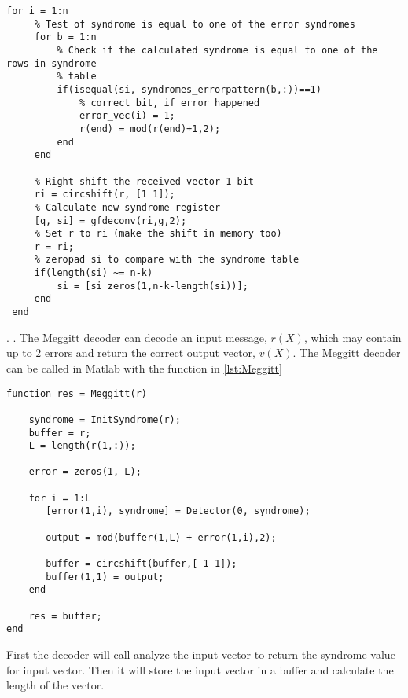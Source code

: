 \documentclass[Main]{subfiles}
\begin{document}
\begin{lstlisting}[caption=Error detection, style=Code-Matlab, label=lst:ErrorDetection]
 for i = 1:n
     % Test of syndrome is equal to one of the error syndromes
     for b = 1:n
         % Check if the calculated syndrome is equal to one of the rows in syndrome
         % table
         if(isequal(si, syndromes_errorpattern(b,:))==1)
             % correct bit, if error happened
             error_vec(i) = 1;
             r(end) = mod(r(end)+1,2);
         end
     end
     
     % Right shift the received vector 1 bit
     ri = circshift(r, [1 1]);
     % Calculate new syndrome register
     [q, si] = gfdeconv(ri,g,2);
     % Set r to ri (make the shift in memory too)
     r = ri;
     % zeropad si to compare with the syndrome table
     if(length(si) ~= n-k)
         si = [si zeros(1,n-k-length(si))];
     end
 end
\end{lstlisting}


.\newline
.\newline
The Meggitt decoder can decode an input message, $r(X)$, which may contain up to 2 errors and return the correct output vector, $v(X)$.
The Meggitt decoder can be called in Matlab with the function in \codeTitle \ref{lst:Meggitt}

\begin{lstlisting}[caption=Meggit decoder function, style=Code-Matlab, label=lst:Meggitt]
function res = Meggitt(r)

	syndrome = InitSyndrome(r);
	buffer = r;
	L = length(r(1,:));
	
	error = zeros(1, L);
	
	for i = 1:L
	   [error(1,i), syndrome] = Detector(0, syndrome); 
	
	   output = mod(buffer(1,L) + error(1,i),2);
	
	   buffer = circshift(buffer,[-1 1]);
	   buffer(1,1) = output;   
	end
	
	res = buffer;
end
\end{lstlisting}
First the decoder will call analyze the input vector to return the syndrome value for input vector.
Then it will store the input vector in a buffer and calculate the length of the vector.
\end{document}
